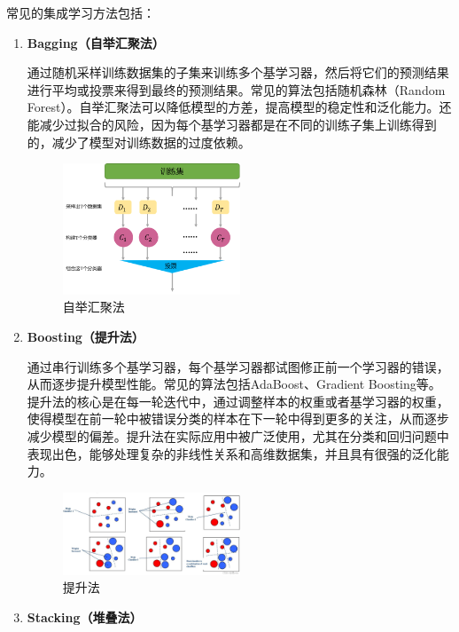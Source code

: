 \documentclass[UTF8]{ctexart}
\begin{document}
常见的集成学习方法包括：
\begin{enumerate}
  \item \textbf{Bagging（自举汇聚法）}
  
  通过随机采样训练数据集的子集来训练多个基学习器，然后将它们的预测结果进行平均或投票来得到最终的预测结果。常见的算法包括随机森林（Random Forest）。自举汇聚法可以降低模型的方差，提高模型的稳定性和泛化能力。还能减少过拟合的风险，因为每个基学习器都是在不同的训练子集上训练得到的，减少了模型对训练数据的过度依赖。
  \begin{figure}[!ht]
    \centering
    \includegraphics[width=0.5\textwidth]{bagging.png}
    \caption{自举汇聚法}
    \label{fig:bagging}
  \end{figure}
  \item \textbf{Boosting（提升法）}
  
  通过串行训练多个基学习器，每个基学习器都试图修正前一个学习器的错误，从而逐步提升模型性能。常见的算法包括AdaBoost、Gradient Boosting等。提升法的核心是在每一轮迭代中，通过调整样本的权重或者基学习器的权重，使得模型在前一轮中被错误分类的样本在下一轮中得到更多的关注，从而逐步减少模型的偏差。提升法在实际应用中被广泛使用，尤其在分类和回归问题中表现出色，能够处理复杂的非线性关系和高维数据集，并且具有很强的泛化能力。
  \begin{figure}[!ht]
    \centering
    \includegraphics[width=0.5\textwidth]{boosting.png}
    \caption{提升法}
    \label{fig:boosting}
  \end{figure}
  \item \textbf{Stacking（堆叠法）}
  

\end{enumerate}
\end{document}
